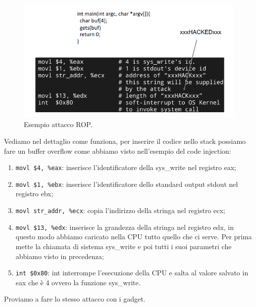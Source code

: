 \begin{figure}[H]
    \centering
    \includegraphics[width=13cm, keepaspectratio]{capitoli/secure_coding/img/cap_3/es_attacco_rop.png}
    \caption{Esempio attacco ROP.}\label{fig:es_attacco_rop}
\end{figure}
Vediamo nel dettaglio come funziona, per inserire il codice nello stack possiamo fare un buffer overflow come abbiamo visto nell'esempio del code injection:
\begin{enumerate}
    \item \verb|movl $4, %eax|: inserisce l'identificatore della sys\_write nel registro eax;
    \item \verb|movl $1, %ebx|: inserisce l'identificatore dello standard output stdout nel registro ebx;
    \item \verb|movl str_addr, %ecx|: copia l'indirizzo della stringa nel registro ecx;
    \item \verb|movl $13, %edx|: inserisce la grandezza della stringa nel registro edx, in questo modo abbiamo caricato nella CPU tutto quello che ci serve. Per prima mette la chiamata di sistema sys\_write e poi tutti i suoi parametri che abbiamo visto in precedenza;
    \item \verb|int $0x80|: int interrompe l'esecuzione della CPU e salta al valore salvato in eax che è 4 ovvero la funzione sys\_write.
\end{enumerate}
Proviamo a fare lo stesso attacco con i gadget.
